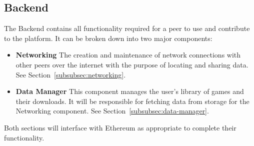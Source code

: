 \subsection{Backend}\label{subsec:backend}

The Backend contains all functionality required for a peer to use and contribute to the platform. It can be broken down into two major components:

\begin{itemize}
  \item \textbf{Networking} The creation and maintenance of network connections with other peers over the internet with the purpose of locating and sharing data. See Section~\ref{subsubsec:networking}.
  \item \textbf{Data Manager} This component manages the user's library of games and their downloads. It will be responsible for fetching data from storage for the Networking component. See Section~\ref{subsubsec:data-manager}.
\end{itemize}

\newparagraph
Both sections will interface with Ethereum as appropriate to complete their functionality. 



